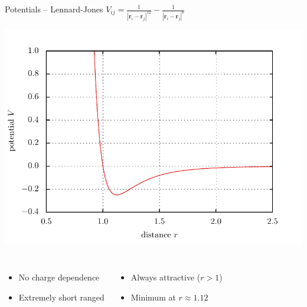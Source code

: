 \documentclass[mathserif,serif]{beamer}
\begin{document}
\begin{frame}{Potentials -- Lennard-Jones}
	\centering
	$V_{ij} = \frac{1}{| \mathbf{r}_i - \mathbf{r}_j |^{12}} - \frac{1}{| \mathbf{r}_i - \mathbf{r}_j |^6}$
	
	
	\includegraphics[height=0.5\textheight]{../report/figures/potential_lennard_jones.pdf}
	\begin{columns}
			\begin{itemize}
				\item No charge dependence
				\item Extremely short ranged
			\end{itemize}
			\begin{itemize}
				\item Always attractive ($r > 1$)
				\item Minimum at $r\approx 1.12$
			\end{itemize}
	\end{columns}
	
\end{frame}

\end{document}
